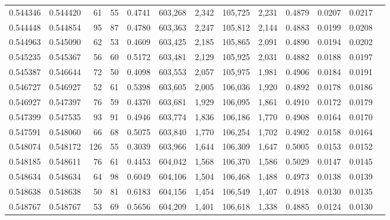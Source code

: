 \begin{tabular}{rrrrrrrrrrrrr}
0.544346 & 0.544420 &    61 &    55 &                                     0.4741 & 603,268 &   2,342 & 105,725 &   2,231 & 0.4879 & 0.0207 & 0.0217 \\
0.544448 & 0.544854 &    95 &    87 &                                     0.4780 & 603,363 &   2,247 & 105,812 &   2,144 & 0.4883 & 0.0199 & 0.0208 \\
0.544963 & 0.545090 &    62 &    53 &                                     0.4609 & 603,425 &   2,185 & 105,865 &   2,091 & 0.4890 & 0.0194 & 0.0202 \\
0.545235 & 0.545367 &    56 &    60 &                                     0.5172 & 603,481 &   2,129 & 105,925 &   2,031 & 0.4882 & 0.0188 & 0.0197 \\
0.545387 & 0.546644 &    72 &    50 &                                     0.4098 & 603,553 &   2,057 & 105,975 &   1,981 & 0.4906 & 0.0184 & 0.0191 \\
0.546727 & 0.546927 &    52 &    61 &                                     0.5398 & 603,605 &   2,005 & 106,036 &   1,920 & 0.4892 & 0.0178 & 0.0186 \\
0.546927 & 0.547397 &    76 &    59 &                                     0.4370 & 603,681 &   1,929 & 106,095 &   1,861 & 0.4910 & 0.0172 & 0.0179 \\
0.547399 & 0.547535 &    93 &    91 &                                     0.4946 & 603,774 &   1,836 & 106,186 &   1,770 & 0.4908 & 0.0164 & 0.0170 \\
0.547591 & 0.548060 &    66 &    68 &                                     0.5075 & 603,840 &   1,770 & 106,254 &   1,702 & 0.4902 & 0.0158 & 0.0164 \\
0.548074 & 0.548172 &   126 &    55 &                                     0.3039 & 603,966 &   1,644 & 106,309 &   1,647 & 0.5005 & 0.0153 & 0.0152 \\
0.548185 & 0.548611 &    76 &    61 &                                     0.4453 & 604,042 &   1,568 & 106,370 &   1,586 & 0.5029 & 0.0147 & 0.0145 \\
0.548634 & 0.548634 &    64 &    98 &                                     0.6049 & 604,106 &   1,504 & 106,468 &   1,488 & 0.4973 & 0.0138 & 0.0139 \\
0.548638 & 0.548638 &    50 &    81 &                                     0.6183 & 604,156 &   1,454 & 106,549 &   1,407 & 0.4918 & 0.0130 & 0.0135 \\
0.548767 & 0.548767 &    53 &    69 &                                     0.5656 & 604,209 &   1,401 & 106,618 &   1,338 & 0.4885 & 0.0124 & 0.0130 \\

\end{tabular}
